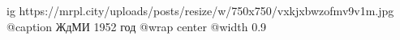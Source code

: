  
 
 
 
 

\ifcmt
  ig https://mrpl.city/uploads/posts/resize/w/750x750/vxkjxbwzofmv9v1m.jpg
	@caption ЖдМИ 1952 год
  @wrap center
  @width 0.9
\fi
